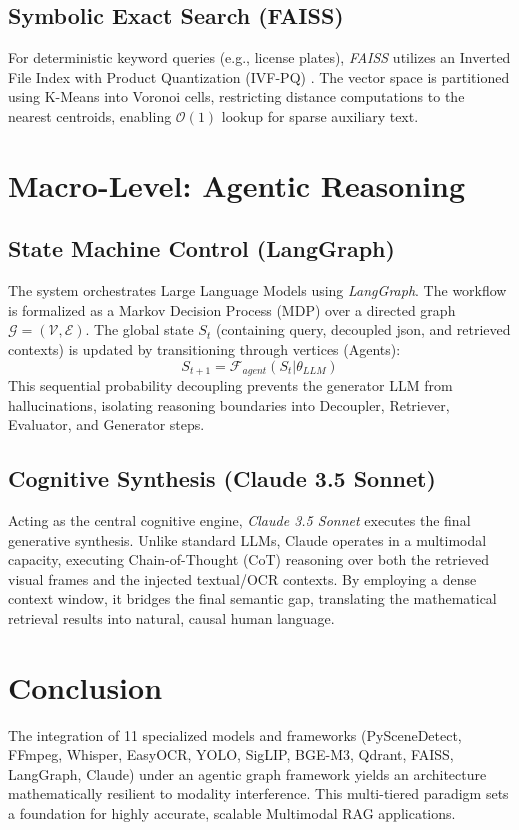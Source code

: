 \documentclass[11pt,a4paper]{article}
\begin{document}
\subsection{Symbolic Exact Search (FAISS)}
For deterministic keyword queries (e.g., license plates), \textit{FAISS} utilizes an Inverted File Index with Product Quantization (IVF-PQ) \cite{johnson2019billion}. The vector space is partitioned using K-Means into Voronoi cells, restricting distance computations to the nearest centroids, enabling $\mathcal{O}(1)$ lookup for sparse auxiliary text.

\section{Macro-Level: Agentic Reasoning}

\subsection{State Machine Control (LangGraph)}
The system orchestrates Large Language Models using \textit{LangGraph}. The workflow is formalized as a Markov Decision Process (MDP) over a directed graph $\mathcal{G} = (\mathcal{V}, \mathcal{E})$. 
The global state $S_t$ (containing query, decoupled json, and retrieved contexts) is updated by transitioning through vertices (Agents):
\begin{equation}
S_{t+1} = \mathcal{F}_{agent}(S_t | \theta_{LLM})
\end{equation}
This sequential probability decoupling prevents the generator LLM from hallucinations, isolating reasoning boundaries into Decoupler, Retriever, Evaluator, and Generator steps.

\subsection{Cognitive Synthesis (Claude 3.5 Sonnet)}
Acting as the central cognitive engine, \textit{Claude 3.5 Sonnet} executes the final generative synthesis. Unlike standard LLMs, Claude operates in a multimodal capacity, executing Chain-of-Thought (CoT) reasoning over both the retrieved visual frames and the injected textual/OCR contexts. By employing a dense context window, it bridges the final semantic gap, translating the mathematical retrieval results into natural, causal human language.

\section{Conclusion}
The integration of 11 specialized models and frameworks (PySceneDetect, FFmpeg, Whisper, EasyOCR, YOLO, SigLIP, BGE-M3, Qdrant, FAISS, LangGraph, Claude) under an agentic graph framework yields an architecture mathematically resilient to modality interference. This multi-tiered paradigm sets a foundation for highly accurate, scalable Multimodal RAG applications.
\end{document}
